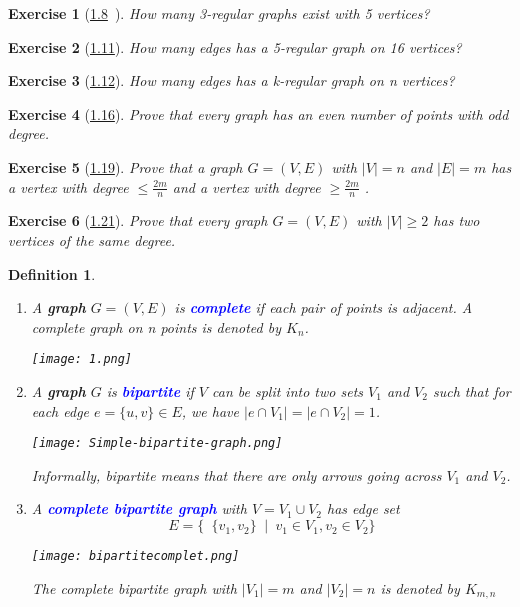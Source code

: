 \documentclass[10pt]{report}
\numberwithin{dummy}{section}
\theoremstyle{ocrenumbox}
\newtheorem{definitionT}{Exercise}[]
\theoremstyle{grayman}
\newtheorem{definitionTTTT}{Definition}[]
\newenvironment{exo}{\begin{dBox}\begin{definitionT}}{\end{definitionT}\end{dBox}}
\newenvironment{voc}{\begin{vBox}\begin{definitionTTTT}}{\end{definitionTTTT}\end{vBox}}
\begin{document}
\begin{exo}[\hypertarget{exo18}{\hyperlink{so18}{1.8}}$\phantom{1}$]
How many 3-regular graphs exist with 5 vertices?
\end{exo}
\begin{exo}[\hypertarget{exo111}{\hyperlink{so111}{1.11}}]
How many edges has a 5-regular graph on 16 vertices?
\end{exo}
\begin{exo}[\hypertarget{exo112}{\hyperlink{so112}{1.12}}]
How many edges has a k-regular graph on n vertices?
\end{exo}
\begin{exo}[\hypertarget{exo116}{\hyperlink{so116}{1.16}}]
Prove that every graph has an even number of points with
odd degree.
\end{exo}
\begin{exo}[\hypertarget{exo119}{\hyperlink{so119}{1.19}}]
Prove that a graph $G = (V, E)$ with $\lvert V \rvert = n$ and $\lvert E \rvert = m$ 
has a vertex with degree $\leq \frac{2m}{n}$ and a vertex with degree $\geq \frac{2m}{n}$ .
\end{exo}
\begin{exo}[\hypertarget{exo121}{\hyperlink{so121}{1.21}}]
Prove that every graph $G = (V, E)$ with $\lvert V \rvert \geq 2$ has two vertices of the same degree.
\end{exo}
\newpage
\begin{voc}{}{}\leavevmode
\begin{enumerate}
    \item A \textbf{graph} $G = (V, E)$ is \textbf{\textcolor{blue}{complete}} if each pair of points is adjacent. A complete graph on n points is denoted by $K_n$.\\
    \begin{center}
    \texttt{[image: 1.png]}
    \end{center}
    
    \item A \textbf{graph} $G$ is \textbf{\textcolor{blue}{bipartite}} if $V$ can be split into two sets $V_1$ and $V_2$ such that for each edge $e = \{u, v\} \in E$, we have $\lvert e\cap V_1 \rvert  = \lvert e\cap V_2 \rvert = 1$. 
    \begin{center}
    \texttt{[image: Simple-bipartite-graph.png]}
    \end{center}
    Informally, bipartite means that there are only arrows going across $V_1$ and $V_2$.
    \item A  \textbf{\textcolor{blue}{complete bipartite graph}} with $V = V_1 \cup V_2$ has edge set \[E = \{\phantom{a}\{v_1, v_2\}\phantom{a}|\phantom{a} v_1 \in V_1, v_2 \in V_2\}\]
    \begin{center}
        \texttt{[image: bipartitecomplet.png]}
    \end{center}
The complete bipartite graph with  $\lvert  V_1 \rvert = m 
$ and $\lvert  V_2 \rvert = n $ is denoted by
$K_{m,n}$
\end{enumerate}

\end{voc}
\end{document}
